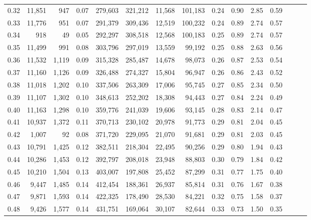 \begin{tabular}{rrrrrrrrrrrrrrr}
0.32 &  11,851 &    947 &  0.07 &  279,603 &  321,212 &   11,568 &  101,183 &  0.24 &  0.90 &  2.85 &      0.59 \\
0.33 &  11,776 &    951 &  0.07 &  291,379 &  309,436 &   12,519 &  100,232 &  0.24 &  0.89 &  2.74 &      0.57 \\
0.34 &     918 &     49 &  0.05 &  292,297 &  308,518 &   12,568 &  100,183 &  0.25 &  0.89 &  2.74 &      0.57 \\
0.35 &  11,499 &    991 &  0.08 &  303,796 &  297,019 &   13,559 &   99,192 &  0.25 &  0.88 &  2.63 &      0.56 \\
0.36 &  11,532 &  1,119 &  0.09 &  315,328 &  285,487 &   14,678 &   98,073 &  0.26 &  0.87 &  2.53 &      0.54 \\
0.37 &  11,160 &  1,126 &  0.09 &  326,488 &  274,327 &   15,804 &   96,947 &  0.26 &  0.86 &  2.43 &      0.52 \\
0.38 &  11,018 &  1,202 &  0.10 &  337,506 &  263,309 &   17,006 &   95,745 &  0.27 &  0.85 &  2.34 &      0.50 \\
0.39 &  11,107 &  1,302 &  0.10 &  348,613 &  252,202 &   18,308 &   94,443 &  0.27 &  0.84 &  2.24 &      0.49 \\
0.40 &  11,163 &  1,298 &  0.10 &  359,776 &  241,039 &   19,606 &   93,145 &  0.28 &  0.83 &  2.14 &      0.47 \\
0.41 &  10,937 &  1,372 &  0.11 &  370,713 &  230,102 &   20,978 &   91,773 &  0.29 &  0.81 &  2.04 &      0.45 \\
0.42 &   1,007 &     92 &  0.08 &  371,720 &  229,095 &   21,070 &   91,681 &  0.29 &  0.81 &  2.03 &      0.45 \\
0.43 &  10,791 &  1,425 &  0.12 &  382,511 &  218,304 &   22,495 &   90,256 &  0.29 &  0.80 &  1.94 &      0.43 \\
0.44 &  10,286 &  1,453 &  0.12 &  392,797 &  208,018 &   23,948 &   88,803 &  0.30 &  0.79 &  1.84 &      0.42 \\
0.45 &  10,210 &  1,504 &  0.13 &  403,007 &  197,808 &   25,452 &   87,299 &  0.31 &  0.77 &  1.75 &      0.40 \\
0.46 &   9,447 &  1,485 &  0.14 &  412,454 &  188,361 &   26,937 &   85,814 &  0.31 &  0.76 &  1.67 &      0.38 \\
0.47 &   9,871 &  1,593 &  0.14 &  422,325 &  178,490 &   28,530 &   84,221 &  0.32 &  0.75 &  1.58 &      0.37 \\
0.48 &   9,426 &  1,577 &  0.14 &  431,751 &  169,064 &   30,107 &   82,644 &  0.33 &  0.73 &  1.50 &      0.35 \\

\end{tabular}
